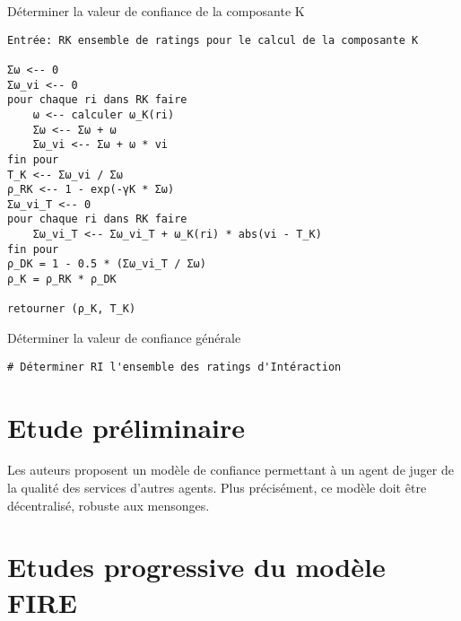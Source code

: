 \documentclass{article}
\begin{document}
\begin{pseudocode}{Déterminer la valeur de confiance de la composante K}
\begin{verbatim}
Entrée: RK ensemble de ratings pour le calcul de la composante K

Σω <-- 0
Σω_vi <-- 0
pour chaque ri dans RK faire
    ω <-- calculer ω_K(ri)
    Σω <-- Σω + ω
    Σω_vi <-- Σω + ω * vi
fin pour
T_K <-- Σω_vi / Σω
ρ_RK <-- 1 - exp(-γK * Σω)
Σω_vi_T <-- 0
pour chaque ri dans RK faire
    Σω_vi_T <-- Σω_vi_T + ω_K(ri) * abs(vi - T_K)
fin pour
ρ_DK = 1 - 0.5 * (Σω_vi_T / Σω)
ρ_K = ρ_RK * ρ_DK

retourner (ρ_K, T_K)
\end{verbatim}
\end{pseudocode}

\begin{pseudocode}{Déterminer la valeur de confiance générale}
\begin{verbatim}
# Déterminer RI l'ensemble des ratings d'Intéraction
\end{verbatim}
\end{pseudocode}



\section{Etude préliminaire}
\label{sec:etude-preliminaire}


Les auteurs proposent un modèle de confiance permettant à un agent de juger de la qualité des services d'autres agents. Plus précisément, ce modèle doit être décentralisé, robuste aux mensonges.



\section{Etudes progressive du modèle FIRE}
\label{sec:etude-progressive}

\end{document}
